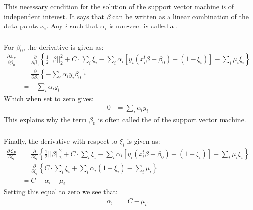 \documentclass[xetex,mathserif,serif,aspectratio=169]{beamer}
\begin{document}
\begin{frame}[fragile] \frametitle{} \oldB \small

This necessary condition for the solution of the support vector machine is
of independent interest. It says that $\beta$ can be written as a linear
combination of the data points $x_i$. Any $i$ such that $\alpha_i$ is non-zero
is called a .

\end{frame}

\begin{frame}[fragile] \frametitle{} \oldB \small

For $\beta_0$, the derivative is given as:
\begin{align*}
\frac{\partial\mathcal{L}_P}{\partial \beta_0} &= \frac{\partial}{\partial \beta_0}
\left\{\frac{1}{2} || \beta ||_2^2 + C \cdot \sum_i \xi_i
  - \sum_i \alpha_i \left[ y_i (x_i^t \beta + \beta_0) - (1 - \xi_i) \right]
  - \sum_i \mu_i \xi_i \right\} \\
  &= \frac{\partial}{\partial \beta_0}
    \left\{ - \sum_i \alpha_i y_i \beta_0 \right\} \\
  &= - \sum_i \alpha_i y_i
\end{align*}
Which when set to zero gives:
\begin{align*}
0 &= \sum_i \alpha_i y_i
\end{align*}
This explains why the term $\beta_0$ is often called the  of
the support vector machine.

\end{frame}

\begin{frame}[fragile] \frametitle{} \oldB \small

Finally, the derivative with respect to $\xi_i$ is given as:
\begin{align*}
\frac{\partial\mathcal{L}_P}{\partial \xi_i} &= \frac{\partial}{\partial \xi_i}
\left\{\frac{1}{2} || \beta ||_2^2 + C \cdot \sum_i \xi_i
  - \sum_i \alpha_i \left[ y_i (x_i^t \beta + \beta_0) - (1 - \xi_i) \right]
  - \sum_i \mu_i \xi_i \right\} \\
  &= \frac{\partial}{\partial \xi_i}
    \left\{ C \cdot \sum_i \xi_i + \sum_i \alpha_i (1 - \xi_i) - \sum_i \mu_i  \right\} \\
  &= C - \alpha_i - \mu_i
\end{align*}
\pause Setting this equal to zero we see that:
\begin{align*}
\alpha_i &= C - \mu_i.
\end{align*}

\end{frame}
\end{document}
